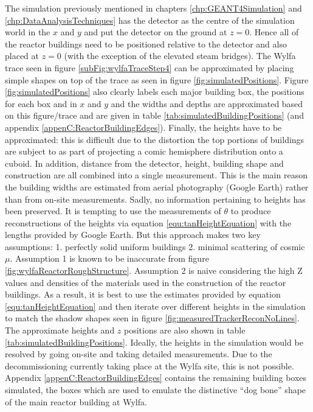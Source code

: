 The simulation previously mentioned in chapters \ref{chp:GEANT4Simulation} and \ref{chp:DataAnalysisTechniques} has the detector as the centre of the simulation world in the $x$ and $y$ and put the detector on the ground at  $z = 0 $. Hence all of the reactor buildings need to be positioned relative to the detector and also placed at $z = 0$ (with the exception of the elevated steam bridges). The Wylfa trace seen in figure \ref{subFig:wylfaTraceStep4} can be approximated by placing simple shapes on top of the trace as seen in figure \ref{fig:simulatedPositions}. Figure \ref{fig:simulatedPositions} also clearly labels each major building box, the positions for each box and in $x$ and $y$ and the widths and depths are approximated based on this figure/trace and are given in table \ref{tab:simulatedBuildingPositions} (and appendix \ref{appenC:ReactorBuildingEdges}). Finally, the heights have to be approximated: this is difficult due to the distortion the top portions of buildings are subject to as part of projecting a comic hemisphere distribution onto a cuboid. In addition, distance from the detector, height, building shape and construction are all combined into a single measurement. This is the main reason the building widths are estimated from aerial photography (Google Earth) rather than from on-site measurements. Sadly, no information pertaining to heights has been preserved. It is tempting to use the measurements of $\theta$ to produce reconstructions of the heights via equation \ref{equ:tanHeightEquation} with the lengths provided by Google Earth. But this approach makes two key assumptions: 1. perfectly solid uniform buildings 2. minimal scattering of cosmic $\mu$. Assumption 1 is known to be inaccurate from figure \ref{fig:wylfaReactorRoughStructure}. Assumption 2 is naive considering the high Z values and densities of the materials used in the construction of the reactor buildings. As a result, it is best to use the estimates provided by equation \ref{equ:tanHeightEquation} and then iterate over different heights in the simulation to match the shadow shapes seen in figure \ref{fig:measuredTrackerReconNoLines}. The approximate heights and $z$ positions are also shown in table \ref{tab:simulatedBuildingPositions}. Ideally, the heights in the simulation would be resolved by going on-site and taking detailed measurements. Due to the decommissioning currently taking place at the Wylfa site, this is not possible. Appendix \ref{appenC:ReactorBuildingEdges} contains the remaining building boxes simulated, the boxes which are used to emulate the distinctive ``dog bone'' shape of the main reactor building at Wylfa.

